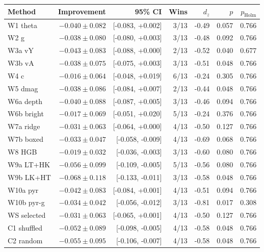 \begin{tabular}{lrrrrrr}
\toprule
Method & Improvement & 95\% CI & Wins & $d_z$ & $p$ & $p_{\mathrm{Holm}}$ \\
\midrule
W1 theta & $-0.040 \pm 0.082$ & [-0.083, +0.002] & 3/13 & -0.49 & 0.057 & 0.766 \\
W2 g & $-0.038 \pm 0.080$ & [-0.080, +0.003] & 3/13 & -0.48 & 0.092 & 0.766 \\
W3a vY & $-0.043 \pm 0.083$ & [-0.088, +0.000] & 2/13 & -0.52 & 0.040 & 0.677 \\
W3b vA & $-0.038 \pm 0.075$ & [-0.075, +0.003] & 3/13 & -0.51 & 0.048 & 0.766 \\
W4 c & $-0.016 \pm 0.064$ & [-0.048, +0.019] & 6/13 & -0.24 & 0.305 & 0.766 \\
W5 dmag & $-0.038 \pm 0.086$ & [-0.084, +0.007] & 2/13 & -0.44 & 0.048 & 0.766 \\
W6a depth & $-0.040 \pm 0.088$ & [-0.087, +0.005] & 3/13 & -0.46 & 0.094 & 0.766 \\
W6b bright & $-0.017 \pm 0.069$ & [-0.051, +0.020] & 5/13 & -0.24 & 0.376 & 0.766 \\
W7a ridge & $-0.031 \pm 0.063$ & [-0.064, +0.000] & 4/13 & -0.50 & 0.127 & 0.766 \\
W7b boxed & $-0.033 \pm 0.047$ & [-0.058, -0.009] & 4/13 & -0.69 & 0.068 & 0.766 \\
W8 HGB & $-0.019 \pm 0.032$ & [-0.036, -0.003] & 3/13 & -0.60 & 0.080 & 0.766 \\
W9a LT+HK & $-0.056 \pm 0.099$ & [-0.109, -0.005] & 5/13 & -0.56 & 0.080 & 0.766 \\
W9b LK+HT & $-0.068 \pm 0.118$ & [-0.133, -0.011] & 3/13 & -0.58 & 0.048 & 0.766 \\
W10a pyr & $-0.042 \pm 0.083$ & [-0.084, +0.001] & 4/13 & -0.51 & 0.094 & 0.766 \\
W10b pyr-g & $-0.034 \pm 0.042$ & [-0.056, -0.012] & 3/13 & -0.81 & 0.017 & 0.308 \\
WS selected & $-0.031 \pm 0.063$ & [-0.065, +0.001] & 4/13 & -0.50 & 0.127 & 0.766 \\
C1 shuffled & $-0.052 \pm 0.089$ & [-0.098, -0.005] & 4/13 & -0.58 & 0.048 & 0.766 \\
C2 random & $-0.055 \pm 0.095$ & [-0.106, -0.007] & 4/13 & -0.58 & 0.048 & 0.766 \\
\bottomrule
\end{tabular}
